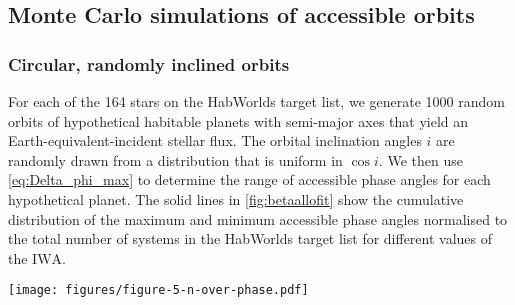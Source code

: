 \documentclass[usenatbib]{mnras}
\newcommand{\IWA}{\ensuremath{\mathrm{IWA}}\xspace}
\newcommand{\HWO}{HabWorlds\xspace}
\newcommand{\Decadal}{Astro2020}  %
\begin{document}
\subsection{Monte Carlo simulations of accessible orbits}
\label{subsec:2.3}

\subsubsection{Circular, randomly inclined orbits}
\label{sec:circular}

For each of the 164 stars on the \HWO target list, we generate \num{1000} random orbits of hypothetical habitable planets with semi-major axes that yield an Earth-equivalent-incident stellar flux. 
The orbital inclination angles $i$ are randomly drawn from a distribution that is uniform in $\cos i$. 
We then use \cref{eq:Delta_phi_max} to determine the range of accessible phase angles for each hypothetical planet.
The solid lines in \cref{fig:betaallofit} show the cumulative distribution of the maximum and minimum accessible phase angles normalised to the total number of systems in the \HWO target list for different values of the \IWA.


\begin{figure*}%
    \centering
    \texttt{[image: figures/figure-5-n-over-phase.pdf]}
    \caption{
        Expected number (computed as the average over \num{1000} simulations) of the most extreme phase angles accessible for different \IWA and for randomly inclined, circular orbits (solid lines) and randomly inclined, eccentric orbits (dashed lines).
        The top and bottom $x$-axes indicate the minimum and maximum accessible phase angles, respectively.
        These angles are symmetric about quadrature (\qty{90}{\degree}).
        The $y$-axis on the left indicates the number of planetary systems divided by the number of Monte Carlo samples, and is thus normalised to the number of systems on the target list.
        The $y$-axis on the right indicates the number of HZ Earth-like planets that could be imaged at these phase angles, assuming an occurrence rate of $\eta_\oplus = \qty{24}{\percent}$ (as in \Decadal).
    }
    \label{fig:betaallofit}
\end{figure*}
\end{document}
